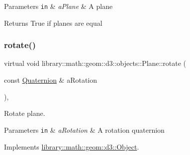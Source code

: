 \begin{DoxyParams}[1]{Parameters}
\mbox{\tt in}  & {\em a\+Plane} & A plane \\
\hline
\end{DoxyParams}
\begin{DoxyReturn}{Returns}
True if planes are equal 
\end{DoxyReturn}
\mbox{\label{classlibrary_1_1math_1_1geom_1_1d3_1_1objects_1_1_plane_a8dea00fbd8b29b1ac15574601cc1015b}} 
\subsubsection{\texorpdfstring{rotate()}{rotate()}}
{\footnotesize\ttfamily virtual void library\+::math\+::geom\+::d3\+::objects\+::\+Plane\+::rotate (\begin{DoxyParamCaption}\item[{const \hyperlink{classlibrary_1_1math_1_1geom_1_1trf_1_1rot_1_1_quaternion}{Quaternion} \&}]{a\+Rotation }\end{DoxyParamCaption})\hspace{0.3cm}{\ttfamily [override]}, {\ttfamily [virtual]}}



Rotate plane. 


\begin{DoxyParams}[1]{Parameters}
\mbox{\tt in}  & {\em a\+Rotation} & A rotation quaternion \\
\hline
\end{DoxyParams}


Implements \hyperlink{classlibrary_1_1math_1_1geom_1_1d3_1_1_object_aabefebc4960530ce6356c4445c5d490e}{library\+::math\+::geom\+::d3\+::\+Object}.

\mbox{\label{classlibrary_1_1math_1_1geom_1_1d3_1_1objects_1_1_plane_a58e3829c1a2f96a571eebe0996850984}} 
